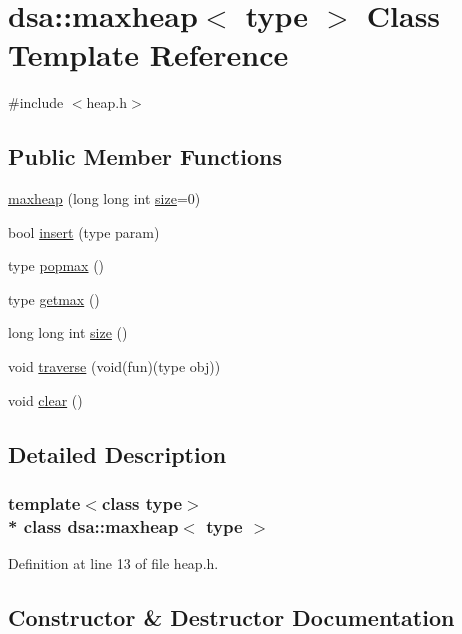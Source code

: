 \hypertarget{classdsa_1_1maxheap}{}\section{dsa\+:\+:maxheap$<$ type $>$ Class Template Reference}
\label{classdsa_1_1maxheap}


{\ttfamily \#include $<$heap.\+h$>$}

\subsection*{Public Member Functions}
\begin{DoxyCompactItemize}
\item 
\hyperlink{classdsa_1_1maxheap_a5ab0978634c273112f3334c483fc5090}{maxheap} (long long int \hyperlink{classdsa_1_1maxheap_a5ff8a30b34a9041c79eb1da3ada849f4}{size}=0)
\item 
bool \hyperlink{classdsa_1_1maxheap_a13267d50c880ca078348bb70139aa263}{insert} (type param)
\item 
type \hyperlink{classdsa_1_1maxheap_a07861d951779efac1c1293bf41b467d5}{popmax} ()
\item 
type \hyperlink{classdsa_1_1maxheap_ae8b94333e590195a61c175de13607564}{getmax} ()
\item 
long long int \hyperlink{classdsa_1_1maxheap_a5ff8a30b34a9041c79eb1da3ada849f4}{size} ()
\item 
void \hyperlink{classdsa_1_1maxheap_adcd0aedb34a2a736d181ec313dba9b74}{traverse} (void(fun)(type obj))
\item 
void \hyperlink{classdsa_1_1maxheap_a8610966f5f402078a735f41425e1b88e}{clear} ()
\end{DoxyCompactItemize}


\subsection{Detailed Description}
\subsubsection*{template$<$class type$>$\\*
class dsa\+::maxheap$<$ type $>$}



Definition at line 13 of file heap.\+h.



\subsection{Constructor \& Destructor Documentation}
